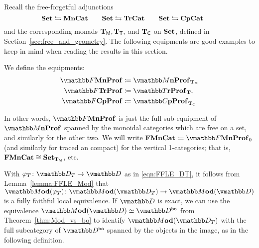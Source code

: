 \documentclass[11pt,oneside,article]{memoir}
\begin{document}
Recall the free-forgetful adjunctions
$$
  \mathbf{Set}\leftrightarrows\mathbf{MnCat}
\qquad
  \mathbf{Set}\leftrightarrows\mathbf{TrCat}
\qquad
  \mathbf{Set}\leftrightarrows\mathbf{CpCat}\qquad
$$
and the corresponding monads $\mathbf{T}_{\mathsf{M}},\mathbf{T}_{\mathsf{T}},$ and $\mathbf{T}_{\mathsf{C}}$ on $\mathbf{Set}$, defined in
Section~\ref{sec:free_and_geometry}. The following equipments are good examples to keep in mind when
reading the results in this section.

\begin{definition}\label{def:freeMon_equips}
   We define the equipments:
   \begin{align*}
      \dFrMonProf  &\coloneqq \dMonProf_{\TM}   \\
      \dFrTrProf   &\coloneqq \dTrProf_{\TT}     \\
      \dFrCompProf &\coloneqq \dCompProf_{\TC}
   \end{align*}
\end{definition}

In other words, $\dFrMonProf$ is just the full sub-equipment of $\dMonProf$ spanned by the monoidal categories which
are free on a set, and similarly for the other two. We will write
$\FrMonCat\coloneqq\dFrMonProf_0$ (and similarly for traced an compact) for the vertical 1-categories; that is, $\mathbf{FMnCat}\cong\mathbf{Set}_{\mathbf{T}_{\mathsf{M}}}$, etc.

With $\varphi_T\colon\dcat{D}_T\to\dcat{D}$ as in \eqref{eqn:FFLE_DT}, it follows from Lemma~\ref{lemma:FFLE_Mod}
that $\dMod(\varphi_T)\colon\dMod(\dcat{D}_T)\to\dMod(\dcat{D})$ is a fully faithful local
equivalence. If $\dcat{D}$ is exact, we can use the equivalence
$\dMod(\dcat{D})\equiv\dcat{D}^{\bo}$ from Theorem~\ref{thm:Mod_vs_bo} to identify
$\dMod(\dcat{D}_T)$ with the full subcategory of $\dcat{D}^{\bo}$ spanned by the objects in the
image, as in the following definition.
\end{document}
